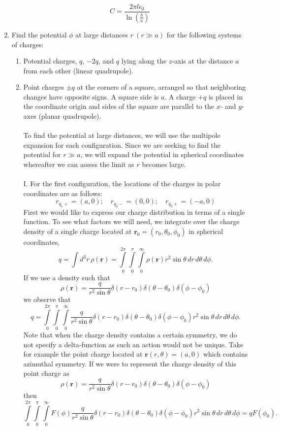 \documentclass[11pt,letterpaper]{article}
\newcommand{\vect}[1]{\mathbf{#1}}
\newcommand{\epo}{\epsilon_0}
\begin{document}
\begin{enumerate}
$$C = \frac{2\pi l\epo}{\ln\left(\frac{b}{a}\right)}$$
\item
Find the potential $\phi$ at large distances $r\ (r\gg a)$ for the following systems of charges:
\begin{enumerate}[label=\Roman*.]
\item
Potential charges, $q$, $-2q$, and $q$ lying along the $z$-axis at the distance $a$ from each other (linear quadrupole).
\item 
Point charges $\pm q$ at the corners of a square, arranged so that neighboring changes have opposite signs. A square side is $a$. A charge $+q$ is placed in the coordinate origin and sides of the square are parallel to the $x$- and $y$-axes (planar quadrupole).
\\ \\ To find the potential at large distances, we will use the multipole expansion for each configuration. Since we are seeking to find the potential for $r\gg a$, we will expand the potential in spherical coordinates  whereafter we can assess the limit as $r$ becomes large. 
\\ \\ I. For the first configuration, the locations of the charges in polar coordinates are as follows:
$$r_{q_1+} = (a,0);\quad r_{q_2-} = (0,0);\quad r_{q_3+} = (-a,0)$$
First we would like to express our charge distribution in terms of a single function. To see what factors we will need, we integrate over the charge density of a single charge located at $\vect r_0 = (r_0,\theta_0,\phi_0)$ in spherical coordinates,
$$q = \int{d^3r\, \rho(\vect r)} = \int\limits_0^{2\pi}\int\limits_0^\pi\int\limits_0^\infty \rho(\vect r)r^{2}\sin\theta\,dr\,d\theta\,d\phi.$$
If we use a density such that
$$\rho(\vect r) = \frac{q}{r^2\sin\theta}\delta(r-r_0)\delta(\theta-\theta_0)\delta(\phi-\phi_0)$$ 
we observe that
$$q=\int\limits_0^{2\pi}\int\limits_0^\pi\int\limits_0^\infty \frac{q}{r^2\sin\theta}\delta(r-r_0)\delta(\theta-\theta_0)\delta(\phi-\phi_0)r^{2}\sin\theta\,dr\,d\theta\,d\phi.$$
Note that when the charge density contains a certain symmetry, we do not specify a delta-function as such an action would not be unique. Take for example the point charge located at $\vect r(r,\theta) = (a,0)$ which contains azimuthal symmetry. If we were to represent the charge density of this point charge as
$$\rho(\vect r) = \frac{q}{r^2\sin\theta}\delta(r-r_0)\delta(\theta-\theta_0)\delta(\phi-\phi_0)$$
then
$$\int\limits_0^{2\pi}\int\limits_0^\pi\int\limits_0^\infty F(\phi)\frac{q}{r^2\sin\theta}\delta(r-r_0)\delta(\theta-\theta_0)\delta(\phi-\phi_0)r^{2}\sin\theta\,dr\,d\theta\,d\phi=qF(\phi_0).$$

\end{enumerate}
\end{enumerate}
\end{document}
